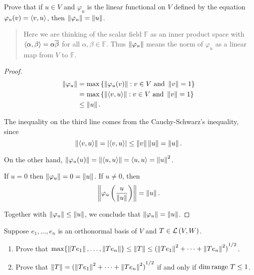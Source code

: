 \begin{exercise}
    Prove that if $u\in V$ and $\varphi_{u}$ is the linear functional on $V$ defined by the equation $\varphi_{u}(v) = \left\langle{v, u}\right\rangle$, then $\left\Vert{\varphi_{u}}\right\Vert = \left\Vert{u}\right\Vert$.
\end{exercise}

\begin{quote}
    Here we are thinking of the scalar field $\mathbb{F}$ as an inner product space with $\left\langle{\alpha, \beta}\right\rangle = \alpha\overline{\beta}$ for all $\alpha, \beta \in \mathbb{F}$. Thus $\left\Vert{\varphi_{u}}\right\Vert$ means the norm of $\varphi_{u}$ as a linear map from $V$ to $\mathbb{F}$.
\end{quote}

\begin{proof}
    \begin{align*}
        \left\Vert{\varphi_{u}}\right\Vert & = \max\left\{ \left\Vert{\varphi_{u}(v)}\right\Vert : v\in V\text{ and }\left\Vert{v}\right\Vert = 1 \right\}   \\
                           & = \max\left\{ \left\Vert{\left\langle{v, u}\right\rangle}\right\Vert : v\in V\text{ and }\left\Vert{v}\right\Vert = 1 \right\} \\
                           & \leq \left\Vert{u}\right\Vert.
    \end{align*}

    The inequality on the third line comes from the Cauchy-Schwarz's inequality, since
    \[
        \left\Vert{\left\langle{v,u}\right\rangle}\right\Vert = \left\vert{\left\langle{v,u}\right\rangle}\right\vert\leq \left\Vert{v}\right\Vert\left\Vert{u}\right\Vert = \left\Vert{u}\right\Vert.
    \]

    On the other hand, $\left\Vert{\varphi_{u}(u)}\right\Vert = \left\Vert{\left\langle{u, u}\right\rangle}\right\Vert = \left\langle{u,u}\right\rangle = \left\Vert{u}\right\Vert^{2}$.

    If $u = 0$ then $\left\Vert{\varphi_{u}}\right\Vert = 0 = \left\Vert{u}\right\Vert$. If $u\ne 0$, then
    \[
        \left\Vert{\varphi_{u}\left(\frac{u}{\left\Vert{u}\right\Vert}\right)}\right\Vert = \left\Vert{u}\right\Vert.
    \]

    Together with $\left\Vert{\varphi_{u}}\right\Vert \leq \left\Vert{u}\right\Vert$, we conclude that $\left\Vert{\varphi_{u}}\right\Vert = \left\Vert{u}\right\Vert$.
\end{proof}
\newpage

\begin{exercise}
    Suppose $e_{1}, \ldots, e_{n}$ is an orthonormal basis of $V$ and $T \in \mathcal{L}\left({V, W}\right)$.
    \begin{enumerate}[label={(\alph*)}]
        \item Prove that $\max\{ \left\Vert{Te_{1}}\right\Vert, \ldots, \left\Vert{Te_{n}}\right\Vert \}\leq \left\Vert{T}\right\Vert \leq {(\left\Vert{Te_{1}}\right\Vert^{2} + \cdots + \left\Vert{Te_{n}}\right\Vert^{2})}^{1/2}$.
        \item Prove that $\left\Vert{T}\right\Vert = {(\left\Vert{Te_{1}}\right\Vert^{2} + \cdots + \left\Vert{Te_{n}}\right\Vert^{2})}^{1/2}$ if and only if $\dim\operatorname{range}\,{T}\leq 1$.
    \end{enumerate}
\end{exercise}

